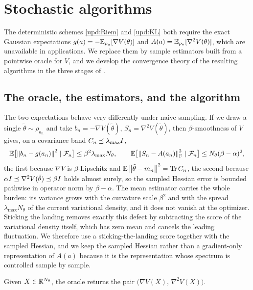 \section{Stochastic algorithms}\label{sec:stochastic}

The deterministic schemes \eqref{upd:Riem} and \eqref{upd:KL} both require the exact Gaussian
expectations $g(a)=-\mathbb{E}_{\rho_a}[\nabla V(\theta)]$ and $A(a)=\mathbb{E}_{\rho_a}[\nabla^2V(\theta)]$, which are
unavailable in applications. We replace them by sample estimators built from a pointwise oracle for
$V$, and we develop the convergence theory of the resulting algorithms in the three stages of
.

\subsection{The oracle, the estimators, and the algorithm}
\label{subsec:stoch-oracle}

The two expectations behave very differently under naive sampling. If we draw a single
$\tilde\theta\sim\rho_{a_n}$ and take $b_n=-\nabla V(\tilde\theta)$, $S_n=\nabla^2V(\tilde\theta)$, then
$\beta$-smoothness of $V$ gives, on a covariance band $C_n\preceq\lambda_{\max}I$,
\[
    \mathbb{E}\bigl[\left\lVert b_n-g(a_n)\right\rVert^2\mid\mathcal{F}_n\bigr]\leq\beta^2\lambda_{\max}N_\theta,
    \qquad
    \mathbb{E}\bigl[\left\lVert S_n-A(a_n)\right\rVert_{\mathrm{F}}^2\mid\mathcal{F}_n\bigr]\leq N_\theta(\beta-\alpha)^2,
\]
the first because $\nabla V$ is $\beta$-Lipschitz and $\mathbb{E}\left\lVert \tilde\theta-m_n\right\rVert^2=\operatorname{Tr} C_n$, the second
because $\alpha I\preceq\nabla^2V(\tilde\theta)\preceq\beta I$ holds almost surely, so the
sampled Hessian error is bounded pathwise in operator norm by $\beta-\alpha$. The mean estimator
carries the whole burden: its variance grows with the curvature scale $\beta^2$ and with the spread
$\lambda_{\max}N_\theta$ of the current variational density, and it does not vanish at the optimizer.
Sticking the landing \citep{roeder2017sticking} removes exactly this defect by subtracting the score of
the variational density itself, which has zero mean and cancels the leading fluctuation. We therefore
use a sticking-the-landing score together with the sampled Hessian, and we keep the sampled Hessian
rather than a gradient-only representation of $A(a)$ because it is the representation whose spectrum is
controlled sample by sample.

\begin{definition}
\label{def:oracle}
Given $X\in\mathbb{R}^{N_\theta}$, the oracle returns the pair $\bigl(\nabla V(X),\,\nabla^2V(X)\bigr)$.
\end{definition}

